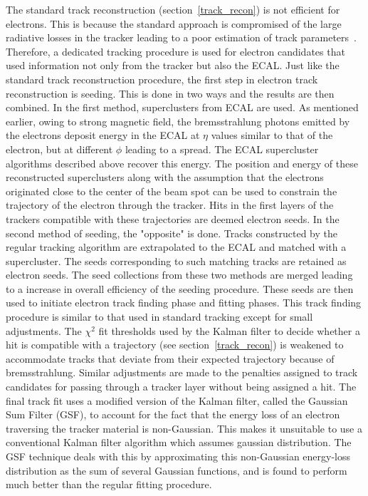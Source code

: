The standard track reconstruction (section~\ref{track_recon}) is not efficient for electrons. This is because the standard approach is compromised of the large radiative losses in the tracker leading to a poor estimation of track parameters~\cite{track_reconstruction}. Therefore, a dedicated tracking procedure is used for  electron candidates that used information not only from the tracker but also the ECAL. Just like the standard track reconstruction procedure, the first step in electron track reconstruction is seeding. This is done in two ways and the results are then combined. In the first method, superclusters from ECAL are used. As mentioned earlier, owing to strong magnetic field, the bremsstrahlung photons emitted by the electrons deposit energy in the ECAL at $\eta$ values similar to that of the electron, but at different $\phi$ leading to a spread. The ECAL supercluster algorithms described above recover this energy. The position and  energy of these reconstructed superclusters along with the assumption that the electrons originated close to the center of the beam spot can be used to constrain the trajectory of the electron through the tracker. Hits in the first layers of the trackers compatible with these trajectories are deemed electron seeds. In the second method of seeding, the "opposite" is done. Tracks constructed by the regular tracking algorithm are extrapolated to the ECAL and matched with a supercluster. The seeds corresponding to such matching tracks are retained as electron seeds. The seed collections from these two methods are merged leading to a increase in overall efficiency of the seeding procedure. These seeds are then used to initiate electron track finding phase and fitting phases. This track finding procedure is similar to that used in standard tracking except for small adjustments. The $\chi^2$ fit thresholds used by the Kalman filter to decide whether a hit is compatible with a trajectory (see section~\ref{track_recon}) is weakened to accommodate tracks that deviate from their expected trajectory because of bremsstrahlung. Similar adjustments are made to the penalties assigned to track candidates for passing through a tracker layer without being assigned a hit. The final track fit uses a modified version of the Kalman filter, called the Gaussian Sum Filter (GSF), to account for the fact that the energy loss of an electron traversing the tracker material is non-Gaussian. This  makes it unsuitable to use a conventional Kalman filter algorithm which assumes gaussian distribution. The GSF technique deals with this by approximating this non-Gaussian energy-loss distribution as the sum of several Gaussian functions, and is found to perform much better than the regular fitting procedure.

